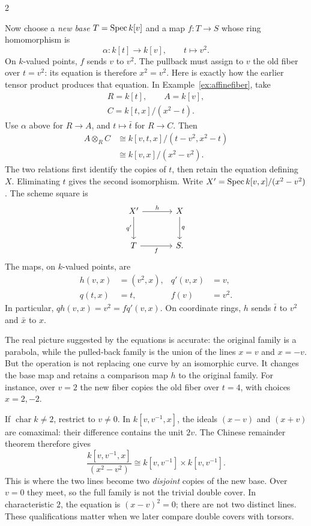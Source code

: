\documentclass[12pt]{memoir}
\begin{document}
\begin{multicols}{2}
\begin{Ex}
Now choose a \emph{new base} $T=\operatorname{Spec} k[v]$ and a map $f:T\to S$
whose ring homomorphism is
\[
 \alpha:k[t]\longrightarrow k[v],\qquad t\longmapsto v^2.
\]
On $k$-valued points, $f$ sends $v$ to $v^2$. The pullback must assign
to $v$ the old fiber over $t=v^2$: its equation is therefore $x^2=v^2$.
Here is exactly how the earlier tensor product produces that equation.
In Example~\ref{ex:affinefiber}, take
\[
\begin{gathered}
 R=k[t],\qquad A=k[v],\\
 C=k[t,x]/(x^2-t).
\end{gathered}
\]
Use $\alpha$ above for $R\to A$, and $t\mapsto\bar t$ for
$R\to C$. Then
\[
\begin{aligned}
A\otimes_R C
 &\cong k[v,t,x]/(t-v^2,x^2-t)\\
 &\cong k[v,x]/(x^2-v^2).
\end{aligned}
\]
The two relations first identify the copies of $t$, then retain the
equation defining $X$. Eliminating $t$ gives the second isomorphism.
Write $X'=\operatorname{Spec} k[v,x]/(x^2-v^2)$. The scheme square is
\[
\begin{tikzcd}[column sep=large,row sep=large]
X' \arrow[r,"h"] \arrow[d,"q'"'] &X \arrow[d,"q"]\\
T \arrow[r,"f"'] &S.
\end{tikzcd}
\]
The maps, on $k$-valued points, are
\[
\begin{aligned}
h(v,x)&=(v^2,x),& q'(v,x)&=v,\\
q(t,x)&=t,& f(v)&=v^2.
\end{aligned}
\]
In particular, $qh(v,x)=v^2=fq'(v,x)$.
On coordinate rings, $h$ sends $\bar t$ to $v^2$ and $\bar x$ to $x$.

The real picture suggested by the equations is accurate: the original
family is a parabola, while the pulled-back family is the union of
the lines $x=v$ and $x=-v$. But the operation is not replacing one
curve by an isomorphic curve. It changes the base map and retains a
comparison map $h$ to the original family. For instance, over $v=2$
the new fiber copies the old fiber over $t=4$, with choices $x=2,-2$.

If $\operatorname{char}k\ne2$, restrict to $v\ne0$. In
$k[v,v^{-1},x]$, the ideals $(x-v)$ and $(x+v)$ are comaximal:
their difference contains the unit $2v$. The Chinese remainder theorem
therefore gives
\[
 \frac{k[v,v^{-1},x]}{(x^2-v^2)}
 \cong k[v,v^{-1}]\times k[v,v^{-1}].
\]
This is where the two lines become two \emph{disjoint} copies of the
new base. Over $v=0$ they meet, so the full family is not the trivial
double cover. In characteristic $2$, the equation is $(x-v)^2=0$;
there are not two distinct lines. These qualifications matter when
we later compare double covers with torsors.
\end{Ex}


\end{multicols}
\end{document}
